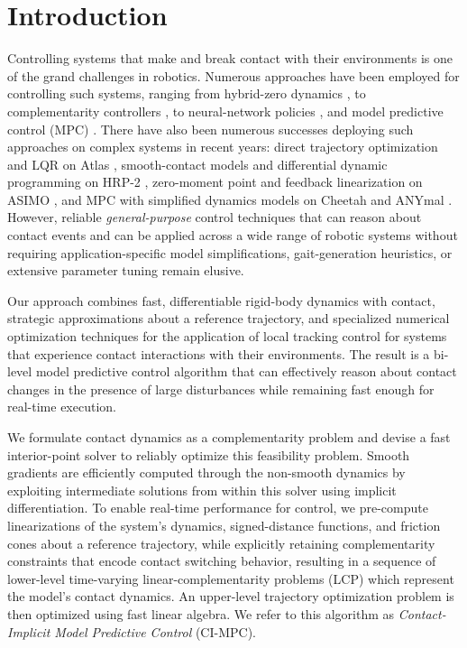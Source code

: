 \section{Introduction}
Controlling systems that make and break contact with their environments is one of the grand challenges in robotics. Numerous approaches have been employed for controlling such systems, ranging from hybrid-zero dynamics \cite{westervelt2003hybrid, ames2014rapidly, li2021reinforcement}, to complementarity controllers \cite{aydinoglu2020contact}, to neural-network policies \cite{heess2017emergence,heiden2020neuralsim}, and model predictive control (MPC) \cite{winkler2018gait, sleiman2021unified}. There have also been numerous successes deploying such approaches on complex systems in recent years: direct trajectory optimization and LQR on Atlas \cite{kuindersma2016optimization}, smooth-contact models and differential dynamic programming on HRP-2  \cite{todorov2012mujoco, koenemann2015whole}, zero-moment point and feedback linearization on ASIMO \cite{hirai1998development}, and MPC with simplified dynamics models on Cheetah \cite{bledt2020regularized} and ANYmal \cite{lee2020learning}. However, reliable \emph{general-purpose} control techniques that can reason about contact events and can be applied across a wide range of robotic systems without requiring application-specific model simplifications, gait-generation heuristics, or extensive parameter tuning remain elusive.

Our approach combines fast, differentiable rigid-body dynamics with contact, strategic approximations about a reference trajectory, and specialized numerical optimization techniques for the application of local tracking control for systems that experience contact interactions with their environments. The result is a bi-level model predictive control algorithm that can effectively reason about contact changes in the presence of large disturbances while remaining fast enough for real-time execution.

We formulate contact dynamics as a complementarity problem and devise a fast interior-point solver to reliably optimize this feasibility problem. Smooth gradients are efficiently computed through the non-smooth dynamics by exploiting intermediate solutions from within this solver using implicit differentiation. To enable real-time performance for control, we pre-compute linearizations of the system's dynamics, signed-distance functions, and friction cones about a reference trajectory, while explicitly retaining complementarity constraints that encode contact switching behavior, resulting in a sequence of lower-level time-varying linear-complementarity problems (LCP) which represent the model's contact dynamics. An upper-level trajectory optimization problem is then optimized using fast linear algebra. We refer to this algorithm as \textit{Contact-Implicit Model Predictive Control} (CI-MPC).

